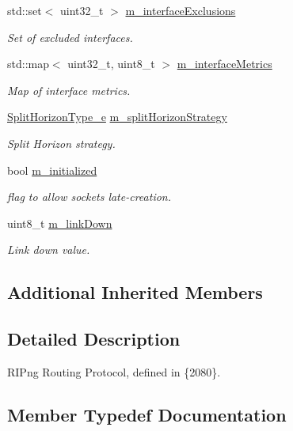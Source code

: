 \begin{DoxyCompactItemize}
std\+::set$<$ uint32\+\_\+t $>$ \hyperlink{classns3_1_1RipNg_a98c5b63bb7c56afa595c1bb568a7081f}{m\+\_\+interface\+Exclusions}
\begin{DoxyCompactList}\small\item\em Set of excluded interfaces. \end{DoxyCompactList}\item 
std\+::map$<$ uint32\+\_\+t, uint8\+\_\+t $>$ \hyperlink{classns3_1_1RipNg_aa63ca4f7ad5ad13c878220c51d8b89c5}{m\+\_\+interface\+Metrics}
\begin{DoxyCompactList}\small\item\em Map of interface metrics. \end{DoxyCompactList}\item 
\hyperlink{classns3_1_1RipNg_a2baa3148870b411bccfe688079fb40a7}{Split\+Horizon\+Type\+\_\+e} \hyperlink{classns3_1_1RipNg_a2aaaf4747380a0960cc48cb04ae99a1a}{m\+\_\+split\+Horizon\+Strategy}
\begin{DoxyCompactList}\small\item\em Split Horizon strategy. \end{DoxyCompactList}\item 
bool \hyperlink{classns3_1_1RipNg_a789ca251ab1d869da5f62a4286067d2d}{m\+\_\+initialized}
\begin{DoxyCompactList}\small\item\em flag to allow socket\textquotesingle{}s late-\/creation. \end{DoxyCompactList}\item 
uint8\+\_\+t \hyperlink{classns3_1_1RipNg_a6752c1bb1fc0909f0493033d426f2b92}{m\+\_\+link\+Down}
\begin{DoxyCompactList}\small\item\em Link down value. \end{DoxyCompactList}\end{DoxyCompactItemize}
\subsection*{Additional Inherited Members}


\subsection{Detailed Description}
R\+I\+Png Routing Protocol, defined in \{2080\}. 

\subsection{Member Typedef Documentation}
